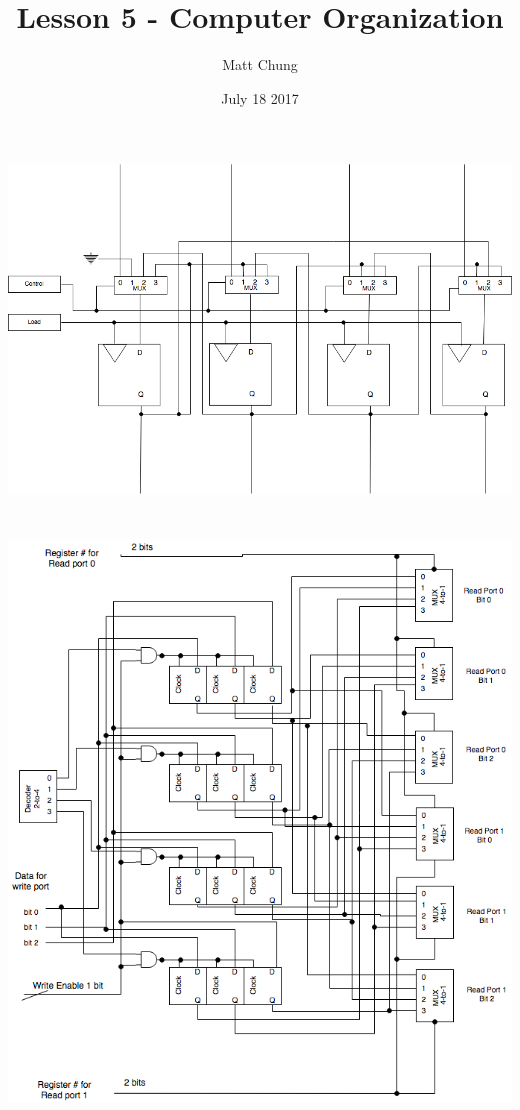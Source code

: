 \documentclass{article}
\title{Lesson 5 - Computer Organization}
\author{Matt Chung}
\date{July 18 2017}
\begin{document}
\maketitle

\section{}
\includegraphics[width=\textwidth, height=\textheight, keepaspectratio]{q1}

\section{}
\includegraphics[width=\textwidth, height=\textheight, keepaspectratio]{lesson-5-question-2}
\end{document}
